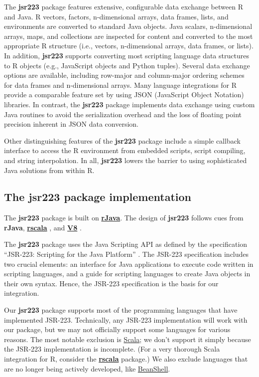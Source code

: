 \documentclass[
article,
11pt, %
a4paper, %
oneside, %
headinclude,footinclude, %
]{scrartcl}
\theoremstyle{definition} %
\theoremstyle{plain} %
\theoremstyle{remark} %
\newcommand{\pkg}[1]{\textbf{#1}}
\newcommand{\CRANpkg}[1]{\href{https://CRAN.R-project.org/package=#1}{\pkg{#1}}}
\begin{document}
The \pkg{jsr223} package features extensive, configurable data exchange between R and Java. R vectors, factors, n-dimensional arrays, data frames, lists, and environments are converted to standard Java objects. Java scalars, n-dimensional arrays, maps, and collections are inspected for content and converted to the most appropriate R structure (i.e., vectors, n-dimensional arrays, data frames, or lists). In addition, \pkg{jsr223} supports converting most scripting language data structures to R objects (e.g., JavaScript objects and Python tuples). Several data exchange options are available, including row-major and column-major ordering schemes for data frames and n-dimensional arrays. Many language integrations for R provide a comparable feature set by using JSON (JavaScript Object Notation) libraries. In contrast, the \pkg{jsr223} package implements data exchange using custom Java routines to avoid the serialization overhead and the loss of floating point precision inherent in JSON data conversion.

Other distinguishing features of the \pkg{jsr223} package include a simple callback interface to access the R environment from embedded scripts, script compiling, and string interpolation. In all, \pkg{jsr223} lowers the barrier to using sophisticated Java solutions from within R.

\subsection{The \pkg{jsr223} package implementation}

The \pkg{jsr223} package is built on \CRANpkg{rJava}. The design of \pkg{jsr223} follows cues from \pkg{rJava}, \CRANpkg{rscala} \citep{rscala}, and \CRANpkg{V8} \citep{v8pkg}.

The \pkg{jsr223} package uses the Java Scripting API \citep{jsa} as defined by the specification “JSR-223: Scripting for the Java Platform” \citep{jsr223spec}. The JSR-223 specification includes two crucial elements: an interface for Java applications to execute code written in scripting languages, and a guide for scripting languages to create Java objects in their own syntax. Hence, the JSR-223 specification is the basis for our integration.

Our \pkg{jsr223} package supports most of the programming languages that have implemented JSR-223. Technically, any JSR-223 implementation will work with our package, but we may not officially support some languages for various reasons. The most notable exclusion is \href{https://www.scala-lang.org/}{Scala}; we don't support it simply because the JSR-223 implementation is incomplete. (For a very thorough Scala integration for R, consider the \CRANpkg{rscala} package.) We also exclude languages that are no longer being actively developed, like \href{http://www.beanshell.org/}{BeanShell}.
\end{document}
